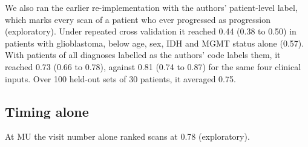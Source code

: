 \documentclass[11pt,a4paper]{article}
\begin{document}
We also ran the earlier re-implementation with the authors' patient-level label, which marks every scan of a patient
who ever progressed as progression (exploratory). Under repeated cross validation it reached 0.44 (0.38 to
0.50) in patients with glioblastoma, below age, sex, IDH and MGMT status alone (0.57). With patients of all diagnoses
labelled as the authors' code labels them, it reached 0.73 (0.66 to 0.78), against 0.81 (0.74 to 0.87) for the same
four clinical inputs. Over 100 held-out sets of 30 patients, it averaged 0.75.

\subsection{Timing alone}\label{sec:S31.2}

At MU the visit number alone ranked scans at 0.78 (exploratory).

\FloatBarrier

\end{document}
